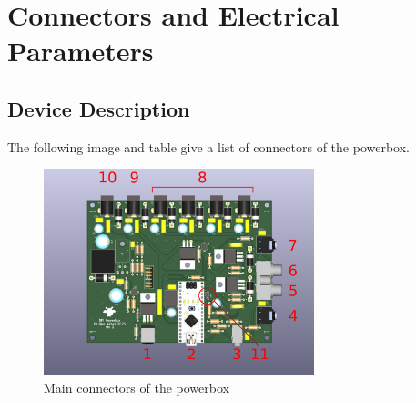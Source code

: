 \documentclass{scrartcl}
\begin{document}
\section{Connectors and Electrical Parameters}
\subsection{Device Description}
The following image and table give a list of connectors of the powerbox.
\begin{figure}[ht!]
  \centering
  \includegraphics[width=0.7\textwidth]{powerbox.pdf}
  \caption{Main connectors of the powerbox}
  \label{fig:powerbox}
\end{figure}
\end{document}

